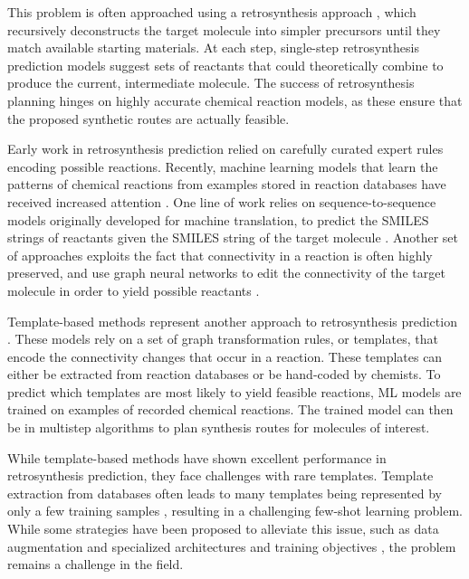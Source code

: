 This problem is often approached using a retrosynthesis approach
\citep{coreyComputerAssistedDesignComplex1969,coreyLogicChemicalSynthesis1991a}, which
recursively deconstructs the target molecule into simpler precursors until they match available
starting materials. At each step, single-step retrosynthesis prediction models suggest sets of
reactants that could theoretically combine to produce the current, intermediate molecule.
The success of retrosynthesis planning hinges on highly accurate chemical reaction models, as these
ensure that the proposed synthetic routes are actually feasible.

Early work in retrosynthesis prediction relied on carefully curated expert rules encoding possible
reactions. Recently, machine learning models that learn the patterns of chemical reactions from
examples stored in reaction databases have received increased attention
\citep{coleyMachineLearningComputerAided2018}. One line of work relies on sequence-to-sequence
models originally developed for machine translation, to predict the SMILES strings of reactants
given the SMILES string of the target molecule
\citep{schwallerMolecularTransformerModel2019,namLinkingNeuralMachine2016,schwallerFoundTranslationPredicting2018,karpovTransformerModelRetrosynthesis2019,tetkoStateoftheartAugmentedNLP2020}.
Another set of approaches exploits the fact that connectivity in a reaction is often highly preserved, and
use graph neural networks to edit the connectivity of the target molecule in order to yield possible
reactants
\citep{sachaMoleculeEditGraph2020,shiGraphGraphsFramework2020,somnathLearningGraphModels2020,yanRetroXpertDecomposeRetrosynthesis2020}.

Template-based methods represent another approach to retrosynthesis prediction
\citep{seglerNeuralSymbolicMachineLearning2017,seglerPlanningChemicalSyntheses2018,daiRetrosynthesisPredictionConditional2020,sunEnergybasedViewRetrosynthesis2020}.
These models rely on a set of graph transformation rules, or templates, that encode the connectivity
changes that occur in a reaction. These templates can either be extracted from reaction databases or
be hand-coded by chemists. To predict which templates are most likely to yield feasible reactions,
\ac{ML} models are trained on examples of recorded chemical reactions. The trained model can then be
in multistep algorithms to plan synthesis routes for molecules of interest.

While template-based methods have shown excellent performance in retrosynthesis prediction, they
face challenges with rare templates. Template extraction from databases often leads to many
templates being represented by only a few training samples
\citep{fortunatoDataAugmentationPretraining2020}, resulting in a challenging few-shot learning
problem. While some strategies have been proposed to alleviate this issue, such as data augmentation
\citep{fortunatoDataAugmentationPretraining2020} and specialized architectures and training
objectives \citep{daiRetrosynthesisPredictionConditional2020}, the problem remains a challenge in
the field.

